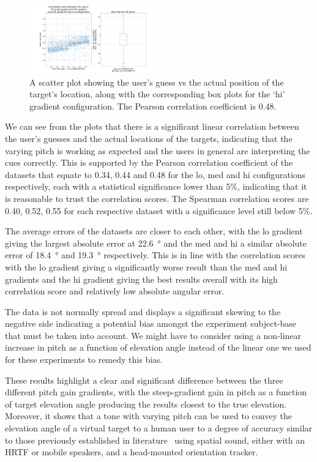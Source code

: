 \documentclass[format=sigconf, review=true, screen=true, anonymous=true]{acmart}
\begin{document}
\begin{figure}
  \centering
  \includegraphics[width=0.5\textwidth]{figures/tilt_err_hi.png}
  \caption{A scatter plot showing the user's guess vs the actual position of the target's location, along with the corresponding box plots for the `hi' gradient configuration. The Pearson correlation coefficient is 0.48. }
  \label{fig:tilt-err-hi}
\end{figure}

We can see from the plots that there is a significant linear correlation between the user's guesses and the actual locations of the targets, indicating that the varying pitch is working as expected and the users in general are interpreting the cues correctly. This is supported by the Pearson correlation coefficient of the datasets that equate to 0.34, 0.44 and 0.48 for the lo, med and hi configurations respectively, each with a statistical significance lower than 5\%, indicating that it is reasonable to trust the correlation scores. The Spearman correlation scores are 0.40, 0.52, 0.55 for each respective dataset with a significance level still below 5\%. 

The average errors of the datasets are closer to each other, with the lo gradient giving the largest absolute error at \SI{22.6}{\degree} and the med and hi a similar absolute error of \SI{18.4}{\degree} and \SI{19.3}{\degree} respectively. This is in line with the correlation scores with the lo gradient giving a significantly worse result than the med and hi gradients and the hi gradient giving the best results overall with its high correlation score and relatively low absolute angular error. 

The data is not normally spread and displays a significant skewing to the negative side indicating a potential bias amongst the experiment subject-base that must be taken into account. We might have to consider using a non-linear increase in pitch as a function of elevation angle instead of the linear one we used for these experiments to remedy this bias.

These results highlight a clear and significant difference between the three different pitch gain gradients, with the steep-gradient gain in pitch as a function of target elevation angle producing the results closest to the true elevation. Moreover, it shows that a tone with varying pitch can be used to convey the elevation angle of a virtual target to a human user to a degree of accuracy similar to those previously established in literature~\cite{bujacz2011sonification, katz2011spatial, zotkin2004rendering} using spatial sound, either with an HRTF or mobile speakers, and a head-mounted orientation tracker.  
\end{document}
